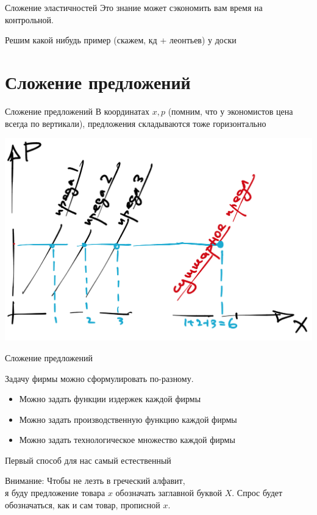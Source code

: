 \documentclass{beamer}
\begin{document}
\begin{frame}{Сложение эластичностей}
Это знание может сэкономить вам время на контрольной.

Решим какой нибудь пример (скажем, кд + леонтьев) у доски
\end{frame}

\section{Сложение предложений}

\begin{frame}{Сложение предложений}
В координатах $x,p$ (помним, что у экономистов цена всегда по вертикали), предложения \alert{складываются тоже горизонтально}
    \begin{center}
     \includegraphics[width=.8\textwidth]{sumsupply}
     \end{center}
\end{frame}

\begin{frame}{Сложение предложений}

Задачу фирмы можно сформулировать по-разному.
\begin{itemize}
  \item Можно задать функции издержек каждой фирмы
  \item Можно задать производственную функцию каждой фирмы
  \item Можно задать технологическое множество каждой фирмы
\end{itemize}
Первый способ для нас самый естественный

\alert{Внимание:} Чтобы не лезть в греческий алфавит,\\ \alert{я буду предложение товара $x$ обозначать заглавной буквой $X$}. Спрос будет  обозначаться, как и сам товар, прописной $x$.

\end{frame}
\end{document}
